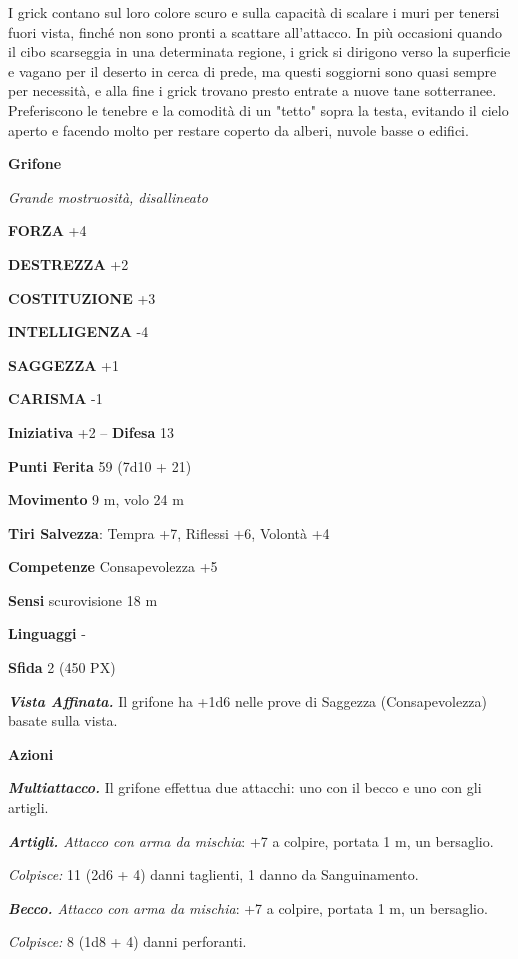 \begin{multicols}{2}
I grick contano sul loro colore scuro e sulla capacità di scalare i muri per tenersi fuori vista, finché non sono pronti a scattare all'attacco. In più occasioni quando il cibo scarseggia in una determinata regione, i grick si dirigono verso la superficie e vagano per il deserto in cerca di prede, ma questi soggiorni sono quasi sempre per necessità, e alla fine i grick trovano presto entrate a nuove tane sotterranee. Preferiscono le tenebre e la comodità di un "tetto" sopra la testa, evitando il cielo aperto e facendo molto per restare coperto da alberi, nuvole basse o edifici.


\medskip{}\textbf{Grifone}

\textit{Grande mostruosità, disallineato}

\textbf{FORZA} +4

\textbf{DESTREZZA} +2

\textbf{COSTITUZIONE} +3

\textbf{INTELLIGENZA} -4

\textbf{SAGGEZZA} +1

\textbf{CARISMA} -1

\textbf{Iniziativa} +2 -- \textbf{Difesa} 13

\textbf{Punti Ferita} 59 (7d10 + 21)

\textbf{Movimento} 9 m, volo 24 m

\textbf{Tiri Salvezza}: Tempra +7, Riflessi +6, Volontà +4

\textbf{Competenze} Consapevolezza +5

\textbf{Sensi} scurovisione 18 m

\textbf{Linguaggi} -

\textbf{Sfida} 2 (450 PX)

\textit{\textbf{Vista Affinata.}} Il grifone ha +1d6 nelle prove di Saggezza (Consapevolezza) basate sulla vista.

\textbf{Azioni}

\textit{\textbf{Multiattacco.}} Il grifone effettua due attacchi: uno con il becco e uno con gli artigli.

\textit{\textbf{Artigli.} Attacco con arma da mischia}: +7 a colpire, portata 1 m, un bersaglio.

\textit{Colpisce:} 11 (2d6 + 4) danni taglienti, 1 danno da Sanguinamento.

\textit{\textbf{Becco.} Attacco con arma da mischia}: +7 a colpire, portata 1 m, un bersaglio.

\textit{Colpisce:} 8 (1d8 + 4) danni perforanti.


\end{multicols}
